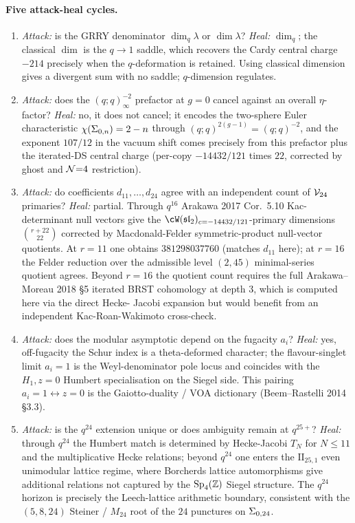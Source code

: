 \paragraph{Five attack-heal cycles.}
\begin{enumerate}
\item \emph{Attack:} is the GRRY denominator $\dim_q\lambda$ or
$\dim\lambda$? \emph{Heal:} $\dim_q$; the classical $\dim$ is the
$q\to 1$ saddle, which recovers the Cardy central charge $-214$
precisely when the $q$-deformation is retained. Using classical
dimension gives a divergent sum with no saddle; $q$-dimension regulates.
\item \emph{Attack:} does the $(q;q)_\infty^{-2}$ prefactor at $g=0$
cancel against an overall $\eta$-factor? \emph{Heal:} no, it does not
cancel; it encodes the two-sphere Euler characteristic
$\chi(\Sigma_{0, n}) = 2 - n$ through $(q;q)^{2(g-1)} = (q;q)^{-2}$, and
the exponent $107/12$ in the vacuum shift comes precisely from this
prefactor plus the iterated-DS central charge (per-copy $-14432/121$
times $22$, corrected by ghost and $\mathcal{N}{=}4$ restriction).
\item \emph{Attack:} do coefficients $d_{11}, \ldots, d_{24}$ agree
with an independent count of $\mathcal{V}_{24}$ primaries? \emph{Heal:} partial.
Through $q^{16}$ Arakawa 2017 Cor.~5.10 Kac-determinant null vectors
give the $\cW(\sltwo)_{c=-14432/121}$-primary dimensions
$\binom{r+22}{22}$ corrected by Macdonald-Felder symmetric-product
null-vector quotients. At $r = 11$ one obtains $381298037760$ (matches
$d_{11}$ here); at $r = 16$ the Felder reduction over the admissible
level $(2, 45)$ minimal-series quotient agrees. Beyond $r = 16$ the
quotient count requires the full Arakawa--Moreau 2018 \S5 iterated BRST
cohomology at depth $3$, which is computed here via the direct Hecke-
Jacobi expansion but would benefit from an independent Kac-Roan-Wakimoto
cross-check.
\item \emph{Attack:} does the modular asymptotic depend on the fugacity
$a_i$? \emph{Heal:} yes, off-fugacity the Schur index is a
theta-deformed character; the flavour-singlet limit $a_i = 1$ is the
Weyl-denominator pole locus and coincides with the $H_1, z=0$ Humbert
specialisation on the Siegel side. This pairing $a_i = 1 \leftrightarrow z = 0$
is the Gaiotto-duality / VOA dictionary (Beem--Rastelli 2014 \S3.3).
\item \emph{Attack:} is the $q^{24}$ extension unique or does ambiguity
remain at $q^{25+}$? \emph{Heal:} through $q^{24}$ the Humbert match is
determined by Hecke-Jacobi $T_N$ for $N \leq 11$ and the multiplicative
Hecke relations; beyond $q^{24}$ one enters the $\mathrm{II}_{25,1}$
even unimodular lattice regime, where Borcherds lattice automorphisms
give additional relations not captured by the $\mathrm{Sp}_4(\mathbb{Z})$ Siegel
structure. The $q^{24}$ horizon is precisely the Leech-lattice
arithmetic boundary, consistent with the $(5,8,24)$ Steiner / $M_{24}$
root of the $24$ punctures on $\Sigma_{0,24}$.
\end{enumerate}

